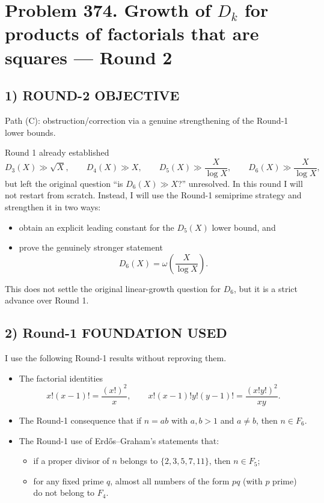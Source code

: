 \section*{Problem 374. Growth of $D_k$ for products of factorials that are squares --- Round 2}

\subsection*{1) ROUND-2 OBJECTIVE}
Path (C): obstruction/correction via a genuine strengthening of the Round-1 lower bounds.

Round 1 already established
\[
D_3(X)\gg \sqrt{X},\qquad D_4(X)\gg X,\qquad D_5(X)\gg \frac{X}{\log X},\qquad D_6(X)\gg \frac{X}{\log X},
\]
but left the original question ``is $D_6(X)\gg X$?'' unresolved.
In this round I will not restart from scratch.  Instead, I will use the Round-1 semiprime strategy and strengthen it in two ways:
\begin{itemize}
\item obtain an explicit leading constant for the $D_5(X)$ lower bound, and
\item prove the genuinely stronger statement
\[
D_6(X)=\omega\!\left(\frac{X}{\log X}\right).
\]
\end{itemize}
This does not settle the original linear-growth question for $D_6$, but it is a strict advance over Round 1.

\subsection*{2) Round-1 FOUNDATION USED}
I use the following Round-1 results without reproving them.
\begin{itemize}
\item The factorial identities
\[
x!(x-1)!=\frac{(x!)^2}{x},
\qquad
x!(x-1)!y!(y-1)!=\frac{(x!y!)^2}{xy}.
\]
\item The Round-1 consequence that if $n=ab$ with $a,b>1$ and $a\neq b$, then $n\in F_6$.
\item The Round-1 use of Erd\H{o}s--Graham's statements that:
  \begin{itemize}
  \item if a proper divisor of $n$ belongs to $\{2,3,5,7,11\}$, then $n\in F_5$;
  \item for any fixed prime $q$, almost all numbers of the form $pq$ (with $p$ prime) do not belong to $F_4$.
  \end{itemize}
\end{itemize}

